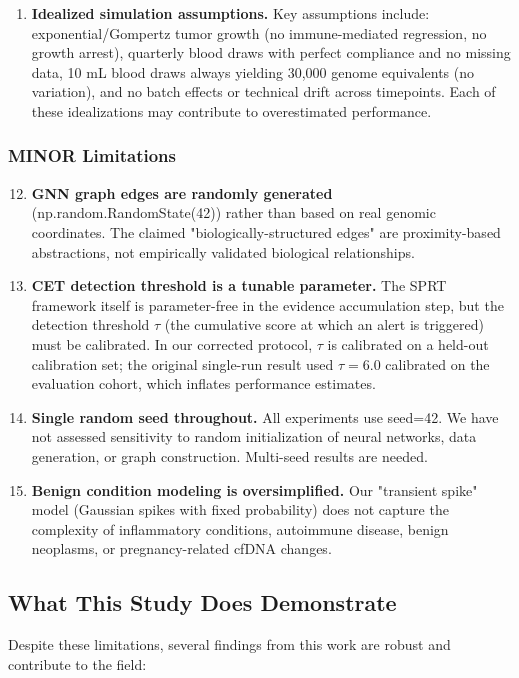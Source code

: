 \documentclass[10pt,a4paper]{article}
\begin{document}
\begin{enumerate}
\item \textbf{Idealized simulation assumptions.} Key assumptions include: exponential/Gompertz tumor growth (no immune-mediated regression, no growth arrest), quarterly blood draws with perfect compliance and no missing data, 10 mL blood draws always yielding 30,000 genome equivalents (no variation), and no batch effects or technical drift across timepoints. Each of these idealizations may contribute to overestimated performance.
\end{enumerate}

\subsubsection{MINOR Limitations}

\begin{enumerate}
\setcounter{enumi}{11}
\item \textbf{GNN graph edges are randomly generated} (np.random.RandomState(42)) rather than based on real genomic coordinates. The claimed "biologically-structured edges" are proximity-based abstractions, not empirically validated biological relationships.
\item \textbf{CET detection threshold is a tunable parameter.} The SPRT framework itself is parameter-free in the evidence accumulation step, but the detection threshold $\tau$ (the cumulative score at which an alert is triggered) must be calibrated. In our corrected protocol, $\tau$ is calibrated on a held-out calibration set; the original single-run result used $\tau=6.0$ calibrated on the evaluation cohort, which inflates performance estimates.
\item \textbf{Single random seed throughout.} All experiments use seed=42. We have not assessed sensitivity to random initialization of neural networks, data generation, or graph construction. Multi-seed results are needed.
\item \textbf{Benign condition modeling is oversimplified.} Our "transient spike" model (Gaussian spikes with fixed probability) does not capture the complexity of inflammatory conditions, autoimmune disease, benign neoplasms, or pregnancy-related cfDNA changes.
\end{enumerate}

\subsection{What This Study Does Demonstrate}

Despite these limitations, several findings from this work are robust and contribute to the field:
\end{document}
